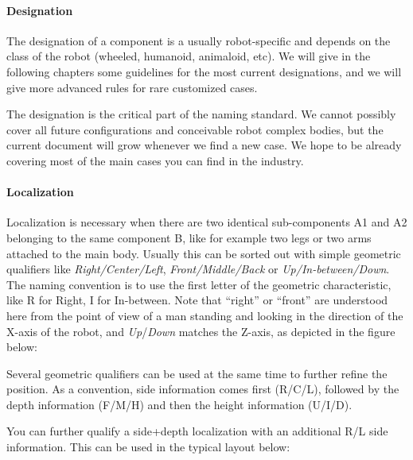 \documentclass[a4paper]{article}
\begin{document}
\paragraph{Designation}


The designation of a component is a usually robot-specific and depends
on the class of the robot (wheeled, humanoid, animaloid, etc). We will
give in the following chapters some guidelines for the most current
designations, and we will give more advanced rules for rare customized
cases.


The designation is the critical part of the naming standard. We cannot
possibly cover all future configurations and conceivable robot complex
bodies, but the current document will grow whenever we find a new case.
We hope to be already covering most of the main cases you can find in
the industry.

\paragraph{Localization }

Localization is necessary when there are two identical
sub-components A1 and A2 belonging to the same component B, like for
example two legs or two arms attached to the main body. Usually this
can be sorted out with simple geometric qualifiers like
\textit{Right/Center/Left},
\textit{Front/Middle/Back} or
\textit{Up}\textit{/In-between/Down}. The
naming convention is to use the first letter of the geometric
characteristic, like R for Right, I for In-between.
Note that “right” or “front” are understood here from the point of view
of a man standing and looking in the direction of the X-axis of the
robot, and
\textit{Up}/\textit{Down} matches
the Z-axis, as depicted in the figure below:

{\par}

Several geometric qualifiers can be used at the same time to
further refine the position. As a convention, side information comes
first (R/C/L), followed by the depth
information (F/M/H) and then the height
information (U/I/D).


You can further qualify a side+depth localization with an additional R/L
side information. This can be used in the typical layout below:

{\centering
\par}
\end{document}
